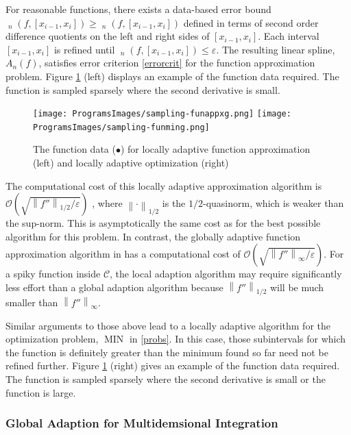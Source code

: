 \documentclass[11pt]{NSFamsart}
\DeclareMathOperator{\err}{err}
\DeclareMathOperator{\oerr}{\overline{\err}}
\DeclareMathOperator{\herr}{\widehat{\err}}
\DeclareMathOperator{\OPT}{MIN}
\newcommand{\cc}{\mathcal{C}}
\newcommand{\norm}[2][{}]{\ensuremath{\left \lVert #2 \right \rVert}_{#1}}
\newcommand{\Order}{\mathcal{O}}
\begin{document}
For 
reasonable functions, there exists a data-based error bound 
$\herr_n(f,[x_{i-1},x_i]) \ge \oerr_n(f,[x_{i-1},x_i])$ defined in terms of second order 
difference 
quotients on the 
left and right sides of $[x_{i-1},x_i]$.  Each interval $[x_{i-1},x_i]$ is refined until  
$\herr_n(f,[x_{i-1},x_i]) \le \varepsilon$.  The resulting linear spline, $A_n(f)$, satisfies error 
criterion \eqref{errorcrit} for the function approximation problem. Figure 
\ref{localadaptfig} (left) displays an example of the function data required.  The function is 
sampled sparsely where the second derivative is small.

\begin{figure}
	\centering
	\vspace{-12ex}
	\texttt{[image: ProgramsImages/sampling-funappxg.png]}
	\texttt{[image: ProgramsImages/sampling-funming.png]}
	
	\vspace{-12ex}
	\caption{The function data ({\color{MATLABOrange}$\bullet$}) for  locally adaptive 
	function approximation  (left) and locally adaptive optimization (right) \label{localadaptfig}}
\end{figure}


The computational cost of this locally adaptive approximation algorithm is 
$\Order\left(\sqrt{\norm[1/2]{f''}/\varepsilon} \right)$ \cite{ChoEtal17a}, where 
$\norm[1/2]{\cdot}$ is the $1/2$-quasinorm, which is weaker than the sup-norm.  This is  
asymptotically the same cost as for the best possible algorithm for this problem. In contrast, 
the globally adaptive function approximation algorithm in \cite{HicEtal14b} has a 
computational cost of $\Order\left(\sqrt{\norm[\infty]{f''}/\varepsilon} \right)$.  For a spiky 
function inside $\cc$, the local adaption algorithm may require significantly less effort 
than a global adaption algorithm because $\norm[1/2]{f''}$ will be much smaller than 
$\norm[\infty]{f''}$.

Similar arguments to those above lead to a locally adaptive algorithm for the 
optimization problem, $\OPT$ in \eqref{probs}.  In this case, those subintervals for which the 
function is definitely greater than the minimum found so far need not be 
refined further.  Figure 
\ref{localadaptfig} (right) gives an example of the function data required.  The function is 
sampled sparsely where the second derivative is small or the function is large.

\subsubsection{Global Adaption for Multidemsional Integration}
\end{document}
